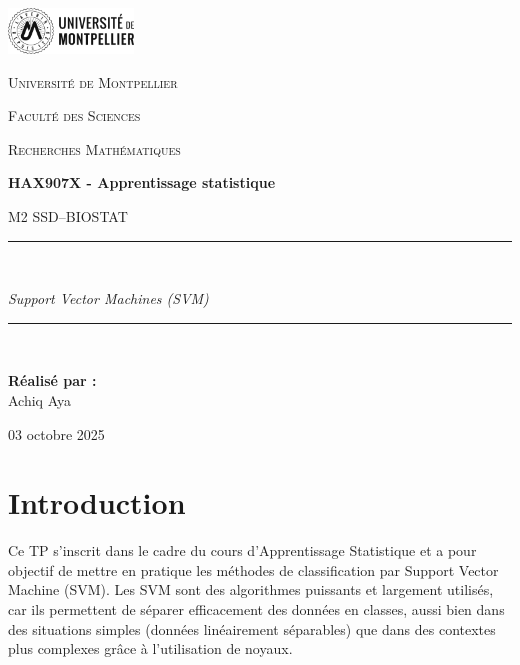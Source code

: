\documentclass[11pt,a4paper]{article}
\begin{document}
\begin{titlepage}
    \centering

    \includegraphics[width=0.25\textwidth]{images/logo.png}\par\vspace{1cm}

    {\scshape\LARGE Université de Montpellier \par}
    {\scshape Faculté des Sciences\par}
    {\scshape Recherches Mathématiques\par}
    \vspace{1.5cm}

    {\Huge \bfseries HAX907X - Apprentissage statistique \par}
    \vspace{0.5cm}
    {\Large M2 SSD--BIOSTAT\par}
    \vspace{1cm}

    \rule{\linewidth}{0.5pt}\\[0.4cm]
    {\huge \itshape Support Vector Machines (SVM)\par}
    \rule{\linewidth}{0.5pt}\\[2cm]

    \begin{center}
    \textbf{Réalisé par :}\\
  Achiq Aya
\end{center}


    \vfill

    {\large 03 octobre 2025\par}
\end{titlepage}

\tableofcontents
\newpage


\section{Introduction}
Ce TP s’inscrit dans le cadre du cours d’Apprentissage Statistique et a pour objectif de mettre en pratique les méthodes de classification par Support Vector Machine (SVM). Les SVM sont des algorithmes puissants et largement utilisés, car ils permettent de séparer efficacement des données en classes, aussi bien dans des situations simples (données linéairement séparables) que dans des contextes plus complexes grâce à l’utilisation de noyaux.
\end{document}

